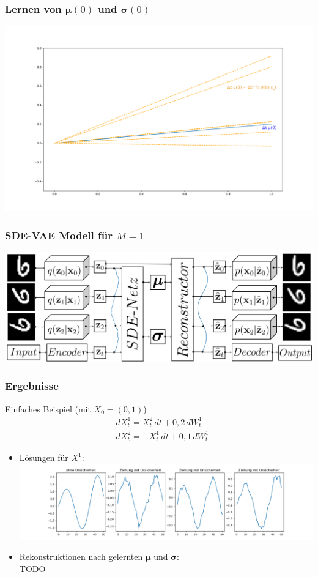 \begin{frame}
	\frametitle{Lernen von $\bm{\mu}(0)$ und $\bm{\sigma}(0)$}
	\includegraphics[scale=0.3]{Bilder/SDE_Erklaerung.png}
	
\end{frame}


\begin{frame}
	\frametitle{SDE-VAE Modell für $M=1$}
	\includegraphics[scale=0.3]{Bilder/SDEVAEGrafik.png}
\end{frame}


\begin{frame}
	\frametitle{Ergebnisse}
	Einfaches Beispiel (mit $X_0 = (0,1)$)
	\begin{align*}
	& dX^1_t = X^2_t \, dt + 0,2 \, dW^1_t\\
	& dX^2_t = -X^1_t \, dt + 0,1 \, dW^1_t
	\end{align*}
	\begin{itemize}
		\item Lösungen für $X^1$:\\
		\includegraphics[scale=0.28]{Bilder/SDE_Loesungen.png}
		
		\item Rekonstruktionen nach gelernten $\bm{\mu}$ und $\bm{\sigma}$:\\
		TODO
	\end{itemize}
	
\end{frame}


